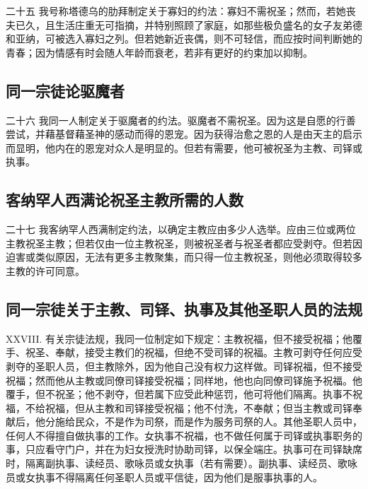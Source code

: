 二十五 我号称塔德乌的肋拜制定关于寡妇的约法：寡妇不需祝圣；然而，若她丧夫已久，且生活庄重无可指摘，并特别照顾了家庭，如那些极负盛名的女子友弟德和亚纳，可被选入寡妇之列。但若她新近丧偶，则不可轻信，而应按时间判断她的青春；因为情感有时会随人年龄而衰老，若非有更好的约束加以抑制。\par


\subsection{同一宗徒论驱魔者}

二十六 我同一人制定关于驱魔者的约法。驱魔者不需祝圣。因为这是自愿的行善尝试，并藉基督藉圣神的感动而得的恩宠。因为获得治愈之恩的人是由天主的启示而显明，他内在的恩宠对众人是明显的。但若有需要，他可被祝圣为主教、司铎或执事。\par


\subsection{客纳罕人西满论祝圣主教所需的人数}

二十七 我客纳罕人西满制定约法，以确定主教应由多少人选举。应由三位或两位主教祝圣主教；但若仅由一位主教祝圣，则被祝圣者与祝圣者都应受剥夺。但若因迫害或类似原因，无法有更多主教聚集，而只得一位主教祝圣，则他必须取得较多主教的许可同意。\par


\subsection{同一宗徒关于主教、司铎、执事及其他圣职人员的法规}

XXVIII. 有关宗徒法规，我同一位制定如下规定：主教祝福，但不接受祝福；他覆手、祝圣、奉献，接受主教们的祝福，但绝不受司铎的祝福。主教可剥夺任何应受剥夺的圣职人员，但主教除外，因为他自己没有权力这样做。司铎祝福，但不接受祝福；然而他从主教或同僚司铎接受祝福；同样地，他也向同僚司铎施予祝福。他覆手，但不祝圣；他不剥夺，但若属下应受此种惩罚，他可将他们隔离。执事不祝福，不给祝福，但从主教和司铎接受祝福；他不付洗，不奉献；但当主教或司铎奉献后，他分施给民众，不是作为司祭，而是作为服务司祭的人。其他圣职人员中，任何人不得擅自做执事的工作。女执事不祝福，也不做任何属于司铎或执事职务的事，只应看守门户，并在为妇女授洗时协助司铎，以保全端庄。执事可在司铎缺席时，隔离副执事、读经员、歌咏员或女执事（若有需要）。副执事、读经员、歌咏员或女执事不得隔离任何圣职人员或平信徒，因为他们是服事执事的人。\par

